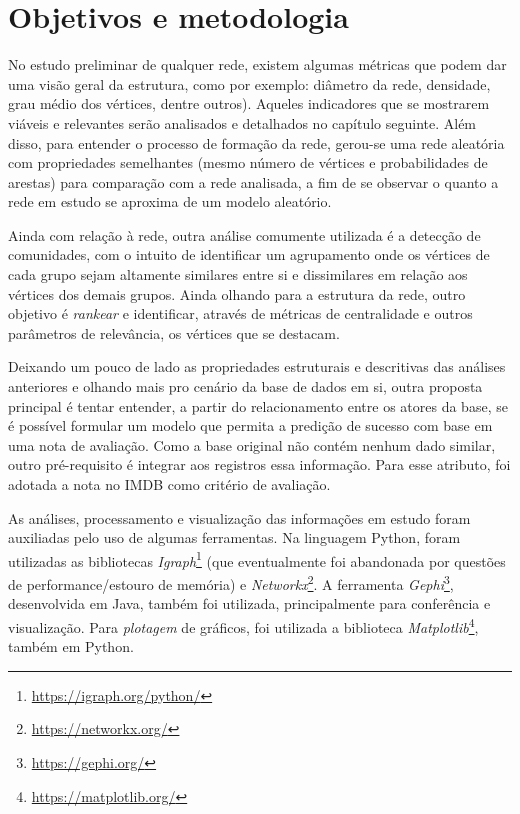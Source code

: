 \chapter{Objetivos e metodologia}

No estudo preliminar de qualquer rede, existem algumas métricas que podem dar uma visão geral da estrutura, como por exemplo: diâmetro da rede, densidade, grau médio dos vértices, dentre outros). Aqueles indicadores que se mostrarem viáveis e relevantes serão analisados e detalhados no capítulo seguinte. Além disso, para entender o processo de formação da rede, gerou-se uma rede aleatória com propriedades semelhantes (mesmo número de vértices e probabilidades de arestas) para comparação com a rede analisada, a fim de se observar o quanto a rede em estudo se aproxima de um modelo aleatório.

Ainda com relação à rede, outra análise comumente utilizada é a detecção de comunidades, com o intuito de identificar um agrupamento onde os vértices de cada grupo sejam altamente similares entre si e dissimilares em relação aos vértices dos demais grupos. Ainda olhando para a estrutura da rede, outro objetivo é \textit{rankear} e identificar, através de métricas de centralidade e outros parâmetros de relevância, os vértices que se destacam.

Deixando um pouco de lado as propriedades estruturais e descritivas das análises anteriores e olhando mais pro cenário da base de dados em si, outra proposta principal é tentar entender, a partir do relacionamento entre os atores da base, se é possível formular um modelo que permita a predição de sucesso com base em uma nota de avaliação. Como a base original não contém nenhum dado similar, outro pré-requisito é integrar aos registros essa informação. Para esse atributo, foi adotada a nota no IMDB como critério de avaliação.

As análises, processamento e visualização das informações em estudo foram auxiliadas pelo uso de algumas ferramentas. Na linguagem Python, foram utilizadas as bibliotecas \textit{Igraph}\footnote{\href{https://igraph.org/python/}{https://igraph.org/python/}} (que eventualmente foi abandonada por questões de performance/estouro de memória) e \textit{Networkx}\footnote{\href{https://networkx.org/}{https://networkx.org/}}. A ferramenta \textit{Gephi}\footnote{\href{https://gephi.org/}{https://gephi.org/}}, desenvolvida em Java, também foi utilizada, principalmente para conferência e visualização. Para \textit{plotagem} de gráficos, foi utilizada a biblioteca \textit{Matplotlib}\footnote{\href{https://matplotlib.org/}{https://matplotlib.org/}}, também em Python.


